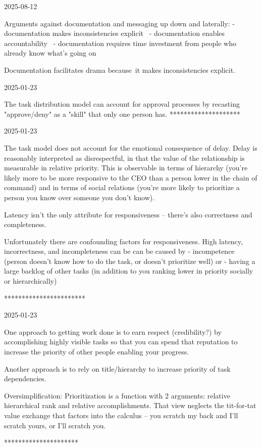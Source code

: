 
2025-08-12

Arguments against documentation and messaging up down and laterally:
- documentation makes inconsistencies explicit 
- documentation enables accountability 
- documentation requires time investment from people who already know what's going on

Documentation facilitates drama because it makes inconsistencies explicit.


2025-01-23

The task distribution model can account for approval processes by recasting "approve/deny" as a "skill" that only one person has. 
********************

2025-01-23

The task model does not account for the emotional consequence of delay. Delay is reasonably interpreted as disrespectful, in that the value of the relationship is measurable in relative priority. This is observable in terms of hierarchy (you're likely more to be more responsive to the CEO than a person lower in the chain of command) and in terms of social relations (you're more likely to prioritize a person you know over someone you don't know). 

Latency isn't the only attribute for responsiveness -- there's also correctness and completeness.

Unfortunately there are confounding factors for responsiveness. High latency, incorrectness, and incompleteness can be can be caused by 
- incompetence (person doesn't know how to do the task, or doesn't prioritize well)
or
- having a large backlog of other tasks (in addition to you ranking lower in priority socially or hierarchically)

***********************

2025-01-23

One approach to getting work done is to earn respect (credibility?) by accomplishing highly visible tasks so that you can spend that reputation to increase the priority of other people enabling your progress. 

Another approach is to rely on title/hierarchy to increase priority of task dependencies. 

Oversimplification: Prioritization is a function with 2 arguments: relative hierarchical rank and relative accomplishments.
That view neglects the tit-for-tat value exchange that factors into the calculus -- you scratch my back and I'll scratch yours, or I'll scratch you.

*********************

